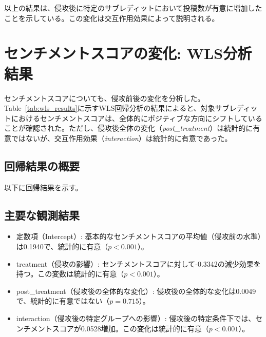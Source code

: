 \documentclass[11pt, a4j]{jreport}
\begin{document}
    以上の結果は、侵攻後に特定のサブレディットにおいて投稿数が有意に増加したことを示している。この変化は交互作用効果によって説明される。

    \section{センチメントスコアの変化: WLS分析結果}
    センチメントスコアについても、侵攻前後の変化を分析した。Table~\ref{tab:wls_results}に示すWLS回帰分析の結果によると、対象サブレディットにおけるセンチメントスコアは、全体的にポジティブな方向にシフトしていることが確認された。ただし、侵攻後全体の変化（\textit{post\_treatment}）は統計的に有意ではないが、交互作用効果（\textit{interaction}）は統計的に有意であった。

    \subsection*{回帰結果の概要}
    以下に回帰結果を示す。

    \begin{table}[H]
    \centering
    \caption{WLS Regression Results for Sentiment Score}
    \label{tab:wls_results}
    \end{table}

    \subsection*{主要な観測結果}
    \begin{itemize}
        \item 定数項（Intercept）: 基本的なセンチメントスコアの平均値（侵攻前の水準）は0.1940で、統計的に有意（$p < 0.001$）。
        \item treatment（侵攻の影響）: センチメントスコアに対して-0.3342の減少効果を持つ。この変数は統計的に有意（$p < 0.001$）。
        \item post\_treatment（侵攻後の全体的な変化）: 侵攻後の全体的な変化は0.0049で、統計的に有意ではない（$p = 0.715$）。
        \item interaction（侵攻後の特定グループへの影響）: 侵攻後の特定条件下では、センチメントスコアが0.0528増加。この変化は統計的に有意（$p < 0.001$）。
    \end{itemize}
\end{document}
